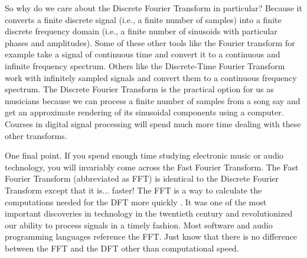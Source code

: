 So why do we care about the Discrete Fourier Transform in particular?  Because it converts a finite discrete
signal (i.e., a finite number of samples) into a finite discrete frequency domain (i.e., a finite number of sinusoids 
with particular phases and amplitudes).  Some of these other tools like the Fourier transform for example take a 
signal of continuous time and convert it to a continuous and infinite frequency spectrum.  Others like the
Discrete-Time Fourier Transform work with infinitely sampled signals and convert them to a continuous frequency
spectrum.  The Discrete Fourier Transform is the practical option for us as musicians because we can process a finite
number of samples from a song say and get an approximate rendering of its sinusoidal components using
a computer.  Courses in
digital signal processing will spend much more time dealing with these other transforms.

One final point.  If you spend enough time studying electronic music or audio technology, you will invariably come
across the Fast Fourier Transform.  The Fast Fourier Transform (abbreviated as FFT) is identical to the Discrete Fourier Transform except
that it is... faster!   The FFT is a way to calculate the computations needed for
the DFT more quickly .  It was one of the most important discoveries in technology in the twentieth century and revolutionized
our ability to process signals in a timely fashion.  Most software and audio programming languages reference
the FFT.  Just know that there is no difference between the FFT and the DFT other than computational speed.
